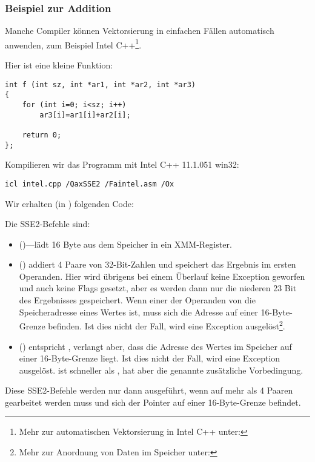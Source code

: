 \subsubsection{Beispiel zur Addition}

Manche Compiler können Vektorsierung in einfachen Fällen automatisch anwenden, zum Beispiel Intel C++\footnote{Mehr zur
automatischen Vektorsierung in Intel C++ unter:\URLINTELVEC}.

Hier ist eine kleine Funktion:

\begin{lstlisting}[style=customc]
int f (int sz, int *ar1, int *ar2, int *ar3)
{
	for (int i=0; i<sz; i++)
		ar3[i]=ar1[i]+ar2[i];

	return 0;
};
\end{lstlisting}


Kompilieren wir das Programm mit Intel C++ 11.1.051 win32:

\begin{verbatim}
icl intel.cpp /QaxSSE2 /Faintel.asm /Ox
\end{verbatim}

Wir erhalten (in \IDA) folgenden Code:



Die SSE2-Befehle sind:
\begin{itemize}
\item
\MOVDQU ()---lädt 16 Byte aus dem Speicher in ein XMM-Register.

\item
\PADDD () addiert 4 Paare von 32-Bit-Zahlen und speichert das Ergebnis im ersten Operanden.
Hier wird übrigens bei einem Überlauf keine Exception geworfen und auch keine Flags gesetzt, aber es werden dann nur die
niederen 23 Bit des Ergebnisses gespeichert.
Wenn einer der Operanden von \PADDD die Speicheradresse eines Wertes ist, muss sich die Adresse auf einer 16-Byte-Grenze
befinden. Ist dies nicht der Fall, wird eine Exception ausgelöst\footnote{Mehr zur Anordnung von Daten im Speicher
unter:\URLWPDA}.

\item
\MOVDQA () entspricht \MOVDQU, verlangt aber, dass die Adresse des Wertes im Speicher
auf einer 16-Byte-Grenze liegt. Ist dies nicht der Fall, wird eine Exception ausgelöst. \MOVDQA ist schneller als
\MOVDQU, hat aber die genannte zusätzliche Vorbedingung.

\end{itemize}
Diese SSE2-Befehle werden nur dann ausgeführt, wenn auf mehr als 4 Paaren gearbeitet werden muss und sich der Pointer
 auf einer 16-Byte-Grenze befindet.

